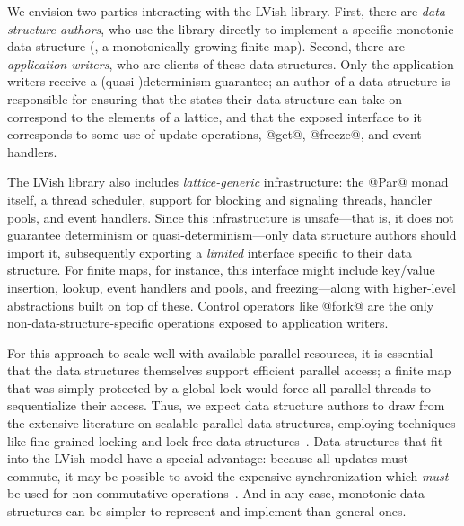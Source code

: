 We envision two parties interacting with the LVish library.  First,
there are \emph{data structure authors}, who use the library directly
to implement a specific monotonic data structure (\eg, a monotonically
growing finite map).  Second, there are \emph{application writers},
who are clients of these data structures.  Only the application
writers receive a \mbox{(quasi-)determinism} guarantee; an author of a
data structure is responsible for ensuring that the states their data
structure can take on correspond to the elements of a lattice, and
that the exposed interface to it corresponds to some use of update
operations, @get@, @freeze@, and event handlers.

The LVish library also includes \emph{lattice-generic} infrastructure:
the @Par@ monad itself, a thread scheduler, support for blocking and
signaling threads, handler pools, and event handlers.  Since this
infrastructure is unsafe---that is, it does not guarantee determinism
or quasi-determinism---only data structure authors should import it,
subsequently exporting a \emph{limited} interface specific to their
data structure.  For finite maps, for instance, this interface might
include key/value insertion, lookup, event handlers and pools, and
freezing---along with higher-level abstractions built on top of these.
Control operators like @fork@ are the only non-data-structure-specific
operations exposed to application writers.

For this approach to scale well with available parallel resources, it
is essential that the data structures themselves support efficient
parallel access; a finite map that was simply protected by a global
lock would force all parallel threads to sequentialize their access.
Thus, we expect data structure authors to draw from the extensive
literature on scalable parallel data structures, employing techniques
like fine-grained locking and lock-free data structures~\cite{art}.
Data structures that fit into the LVish model have a special
advantage: because all updates must commute, it may be possible to
avoid the expensive synchronization which \emph{must} be used for
non-commutative operations~\cite{lawsOfOrder}.  And in any case,
monotonic data structures can be simpler to represent and
implement than general ones.
